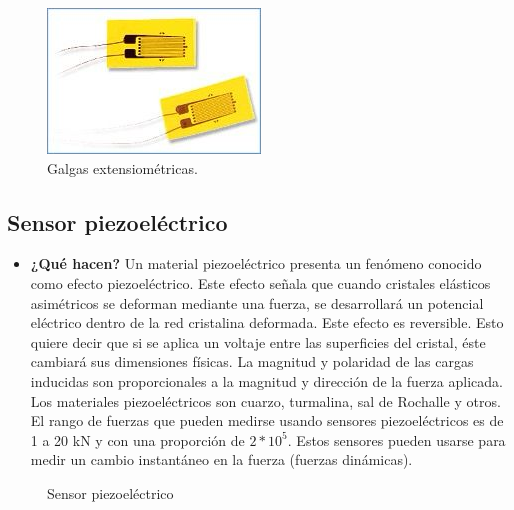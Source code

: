 \begin{figure}[h]
	\centering
	{%
		\includegraphics[width=0.4\linewidth]{img/galgas}
		\caption{Galgas extensiométricas.}
		\label{fig:galgas}
	}
\end{figure}


	\subsection*{Sensor piezoeléctrico}
\begin{itemize}
	\item \textbf{¿Qué hacen?} 
	Un material piezoeléctrico presenta un fenómeno conocido como efecto piezoeléctrico. Este efecto señala que cuando cristales elásticos asimétricos se deforman mediante una fuerza, se desarrollará un potencial eléctrico dentro de la red cristalina deformada. Este efecto es reversible. Esto quiere decir que si se aplica un voltaje entre las superficies del cristal, éste cambiará sus dimensiones físicas. La magnitud y polaridad de las cargas inducidas son proporcionales a la magnitud y dirección de la fuerza aplicada. Los materiales piezoeléctricos son cuarzo, turmalina, sal de Rochalle y otros. El rango de fuerzas que pueden medirse usando sensores piezoeléctricos es de 1 a 20 kN y con una proporción de $2*10^{5}.$ 
	Estos sensores pueden usarse para medir un cambio instantáneo en la fuerza (fuerzas dinámicas). \cite{IngMecafenix_SensorPiezoelectrico}
	
\end{itemize}

\begin{figure}[h]
	\centering
	\hfill
	\caption{Sensor piezoeléctrico}
	\label{fig:mascotas}
\end{figure}

\vspace{15cm}